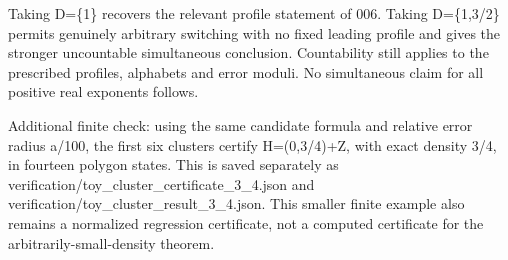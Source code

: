 \documentclass[
  11pt,
]{article}
\theoremstyle{remark}\newtheorem{remark}[theorem]{Remark}
\begin{document}
Taking D=\{1\} recovers the relevant profile statement of 006. Taking
D=\{1,3/2\} permits genuinely arbitrary switching with no fixed leading
profile and gives the stronger uncountable simultaneous conclusion.
Countability still applies to the prescribed profiles, alphabets and
error moduli. No simultaneous claim for all positive real exponents
follows.

Additional finite check: using the same candidate formula and relative
error radius a/100, the first six clusters certify H=(0,3/4)+Z, with
exact density 3/4, in fourteen polygon states. This is saved separately
as verification/toy\_cluster\_certificate\_3\_4.json and
verification/toy\_cluster\_result\_3\_4.json. This smaller finite
example also remains a normalized regression certificate, not a computed
certificate for the arbitrarily-small-density theorem.
\end{document}
